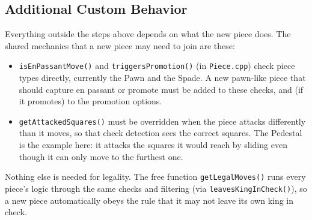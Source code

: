 \subsection{Additional Custom Behavior}\label{section:check_additional_custom_behavior}

Everything outside the steps above depends on what the new piece does. The shared mechanics that a new piece may need to join are these:
\begin{itemize}\itemsep0em
	\item \texttt{isEnPassantMove()} and \texttt{triggersPromotion()} (in \texttt{Piece.cpp}) check piece types directly, currently the Pawn and the Spade. A new pawn-like piece that should capture en passant or promote must be added to these checks, and (if it promotes) to the promotion options.
	\item \texttt{getAttackedSquares()} must be overridden when the piece attacks differently than it moves, so that check detection sees the correct squares. The Pedestal is the example here: it attacks the squares it would reach by sliding even though it can only move to the furthest one.
\end{itemize}

Nothing else is needed for legality. The free function \texttt{getLegalMoves()} runs every piece's logic through the same checks and filtering (via \texttt{leavesKingInCheck()}), so a new piece automatically obeys the rule that it may not leave its own king in check.
